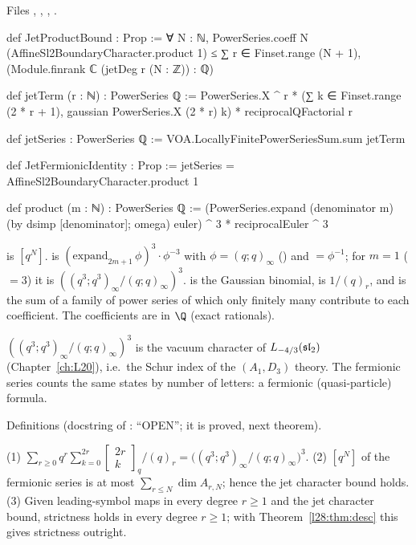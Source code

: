 \noindent Files , , ,
.
\begin{leancode}
def JetProductBound : Prop :=
  ∀ N : ℕ, PowerSeries.coeff N (AffineSl2BoundaryCharacter.product 1) ≤
    ∑ r ∈ Finset.range (N + 1), (Module.finrank ℂ (jetDeg r (N : ℤ)) : ℚ)

def jetTerm (r : ℕ) : PowerSeries ℚ :=
  PowerSeries.X ^ r * (∑ k ∈ Finset.range (2 * r + 1), gaussian PowerSeries.X (2 * r) k) *
    reciprocalQFactorial r

def jetSeries : PowerSeries ℚ := VOA.LocallyFinitePowerSeriesSum.sum jetTerm

def JetFermionicIdentity : Prop := jetSeries = AffineSl2BoundaryCharacter.product 1

def product (m : ℕ) : PowerSeries ℚ :=
  (PowerSeries.expand (denominator m) (by dsimp [denominator]; omega) euler) ^ 3 *
    reciprocalEuler ^ 3
\end{leancode}

\begin{dictionary}
 is $[q^N]$.  is $(\mathrm{expand}_{2m+1}\,\phi)^3\cdot\phi^{-3}$ with $\phi=(q;q)_\infty$ () and
$=\phi^{-1}$; for $m=1$ ($=3$) it is $((q^3;q^3)_\infty/(q;q)_\infty)^3$.  is the
Gaussian binomial,  is $1/(q)_r$, and  is the sum of a family of power series of which
only finitely many contribute to each coefficient. The coefficients are in $\Q$ (exact rationals).
\end{dictionary}

\begin{physics}
$((q^3;q^3)_\infty/(q;q)_\infty)^3$ is the vacuum character of $L_{-4/3}(\mathfrak{sl}_2)$ (Chapter~\ref{ch:L20}), i.e.\ the Schur index of the $(A_1,D_3)$
theory. The fermionic series counts the same states by number of letters: a fermionic (quasi-particle) formula.
\end{physics}

\begin{status}
Definitions (docstring of : ``OPEN''; it is proved, next theorem).
\end{status}

\begin{theorem}\label{l28:thm:jetfermionic}
(1) $\sum_{r\ge0}q^r\sum_{k=0}^{2r}\left[\begin{smallmatrix}2r\\k\end{smallmatrix}\right]_q/(q)_r=\bigl((q^3;q^3)_\infty/(q;q)_\infty\bigr)^3$.
(2) $[q^N]$ of the fermionic series is at most $\sum_{r\le N}\dim A_{r,N}$; hence the jet character bound holds. (3) Given leading-symbol maps in every degree
$r\ge1$ and the jet character bound, strictness holds in every degree $r\ge1$; with Theorem~\ref{l28:thm:desc} this gives strictness outright.
\end{theorem}

